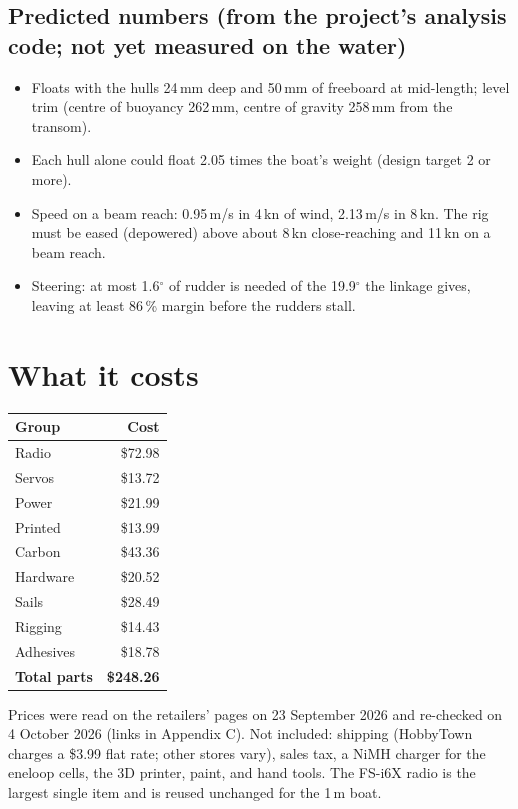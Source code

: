 \documentclass[11pt]{article}
\begin{document}
\subsection*{Predicted numbers (from the project's analysis code; not yet measured on the water)}
\begin{itemize}
\item Floats with the hulls 24\,mm deep and 50\,mm of freeboard at mid-length; level trim (centre of buoyancy 262\,mm, centre of gravity 258\,mm from the transom).
\item Each hull alone could float 2.05 times the boat's weight (design target 2 or more).
\item Speed on a beam reach: 0.95\,m/s in 4\,kn of wind, 2.13\,m/s in 8\,kn. The rig must be eased (depowered) above about 8\,kn close-reaching and 11\,kn on a beam reach.
\item Steering: at most 1.6$^\circ$ of rudder is needed of the 19.9$^\circ$ the linkage gives, leaving at least 86\,\% margin before the rudders stall.
\end{itemize}

\section{What it costs}
\begin{center}
\begin{tabular}{lr}
\toprule
\textbf{Group} & \textbf{Cost} \\
\midrule
Radio & \$72.98 \\
Servos & \$13.72 \\
Power & \$21.99 \\
Printed & \$13.99 \\
Carbon & \$43.36 \\
Hardware & \$20.52 \\
Sails & \$28.49 \\
Rigging & \$14.43 \\
Adhesives & \$18.78 \\
\midrule
\textbf{Total parts} & \textbf{\$248.26} \\
\bottomrule
\end{tabular}
\end{center}
Prices were read on the retailers' pages on 23 September 2026 and re-checked on 4 October 2026 (links in Appendix C). Not included: shipping (HobbyTown charges a \$3.99 flat rate; other stores vary), sales tax, a NiMH charger for the eneloop cells, the 3D printer, paint, and hand tools. The FS-i6X radio is the largest single item and is reused unchanged for the 1\,m boat.
\end{document}
